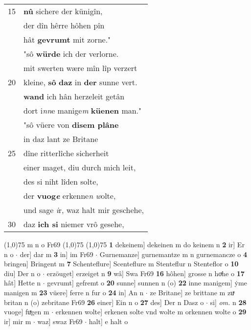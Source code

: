 \documentclass[8pt,a4paper,notitlepage]{article}
\begin{document}
\begin{table}[ht]
\begin{minipage}[t]{0.5\linewidth}
\begin{tabular}{rl}
15 & \textbf{nû} sichere der künigîn,\\ 
 & der dîn hêrre hôhen pîn\\ 
 & hât \textbf{gevrumt} mit zorne."\\ 
 & "sô \textbf{würde} ich der verlorne.\\ 
 & mit swerten wære mîn lîp verzert\\ 
20 & kleine, \textbf{sô} \textbf{daz} in \textbf{der} sunne vert.\\ 
 & \textbf{wand} ich hân herzeleit getân\\ 
 & dort i\textit{nn}e manige\textit{m} \textbf{küenen} man."\\ 
 & "sô vüere von \textbf{disem plâne}\\ 
 & in daz lant ze Britane\\ 
25 & dîne ritterlîche sicherheit\\ 
 & einer maget, diu durch mich leit,\\ 
 & des si niht lîden solte,\\ 
 & der \textbf{vuog\textit{e}} erkenne\textit{n} \textit{w}olte,\\ 
 & und sage \textit{i}r, waz halt mir geschehe,\\ 
30 & daz \textbf{ich si} niemer vrô gesehe,\\ 
\end{tabular}
\scriptsize
\line(1,0){75} \newline
m n o Fr69 \newline
\line(1,0){75} \newline
\newline
\line(1,0){75} \newline
\textbf{1} dekeinem] dekeinen m do keinem n \textbf{2} ir] Er n o  $\cdot$ der] dar m \textbf{3} in] im Fr69  $\cdot$ Gurnemanze] gurnemantze m n gurnemancze o \textbf{4} bringen] Bringent m \textbf{7} Schenteflure] Scenteflure m Stenteflur n Stenteflor o \textbf{10} diu] Der n o  $\cdot$ erzöuget] erzeiget n \textbf{9} wâ] Swa Fr69 \textbf{16} hôhen] grosse n hoͯhe o \textbf{17} hât] Hette n  $\cdot$ gevrumt] gefremt o \textbf{20} sunne] sunnen n (o) \textbf{22} inne manigem] ẏme manigen m \textbf{23} vüere] ferre n fur o \textbf{24} in] An n  $\cdot$ ze Britane] ze brittane m zuͯ britan n (o) zebritane Fr69 \textbf{26} einer] Ein n o \textbf{27} des] Der n Dasz o  $\cdot$ si] \textit{om.} n \textbf{28} vuoge] fuͯgen m  $\cdot$ erkennen wolte] erkenen solte vnd wolte m orkennen wolte o \textbf{29} ir] mir m  $\cdot$ waz] swaz Fr69  $\cdot$ halt] e halt o \newline
\end{minipage}
\end{table}
\end{document}

